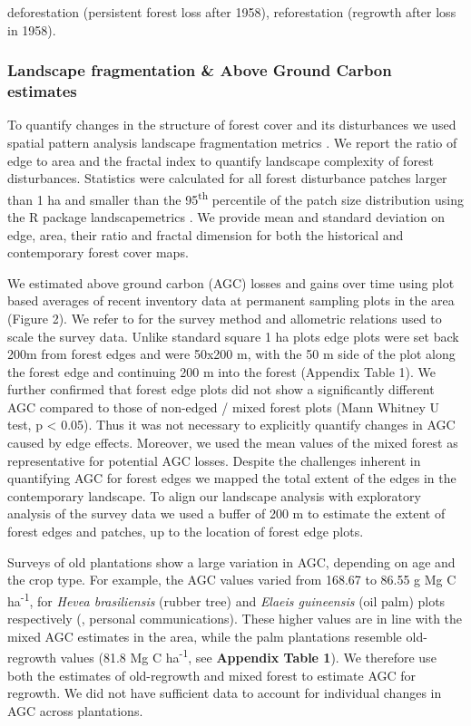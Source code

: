 \documentclass[remote sensing,article,submit,moreauthors,pdftex]{mdpi}
\begin{document}
deforestation (persistent forest loss after 1958), reforestation
(regrowth after loss in 1958).

\hypertarget{landscape-fragmentation-above-ground-carbon-estimates}{%
\subsubsection{Landscape fragmentation \& Above Ground Carbon
estimates}\label{landscape-fragmentation-above-ground-carbon-estimates}}

To quantify changes in the structure of forest cover and its
disturbances we used spatial pattern analysis landscape fragmentation
metrics \citep{dale1999}. We report the ratio of edge to area and the
fractal index to quantify landscape complexity of forest disturbances.
Statistics were calculated for all forest disturbance patches larger
than 1 ha and smaller than the 95\textsuperscript{th} percentile of the
patch size distribution using the R package landscapemetrics
\citep{hesselbarth2019}. We provide mean and standard deviation on edge,
area, their ratio and fractal dimension for both the historical and
contemporary \citet{hansen2013} forest cover maps.

We estimated above ground carbon (AGC) losses and gains over time using
plot based averages of recent inventory data at permanent sampling plots
in the area (Figure 2). We refer to \citet{Kearsley2013} for the survey
method and allometric relations used to scale the survey data. Unlike
standard square 1 ha plots edge plots were set back 200m from forest
edges and were 50x200 m, with the 50 m side of the plot along the forest
edge and continuing 200 m into the forest (Appendix Table 1). We further
confirmed that forest edge plots did not show a significantly different
AGC compared to those of non-edged / mixed forest plots (Mann Whitney U
test, p \textless{} 0.05). Thus it was not necessary to explicitly
quantify changes in AGC caused by edge effects. Moreover, we used the
mean values of the mixed forest as representative for potential AGC
losses. Despite the challenges inherent in quantifying AGC for forest
edges we mapped the total extent of the edges in the contemporary
landscape. To align our landscape analysis with exploratory analysis of
the survey data we used a buffer of 200 m to estimate the extent of
forest edges and patches, up to the location of forest edge plots.

Surveys of old plantations show a large variation in AGC, depending on
age and the crop type. For example, the AGC values varied from 168.67 to
86.55 g Mg C ha\textsuperscript{-1}, for \emph{Hevea brasiliensis}
(rubber tree) and \emph{Elaeis guineensis} (oil palm) plots respectively
(\citet{bustillo2018}, personal communications). These higher values are
in line with the mixed AGC estimates in the area, while the palm
plantations resemble old-regrowth values (81.8 Mg C
ha\textsuperscript{-1}, see \textbf{Appendix Table 1}). We therefore use
both the estimates of old-regrowth and mixed forest to estimate AGC for
regrowth. We did not have sufficient data to account for individual
changes in AGC across plantations.
\end{document}
